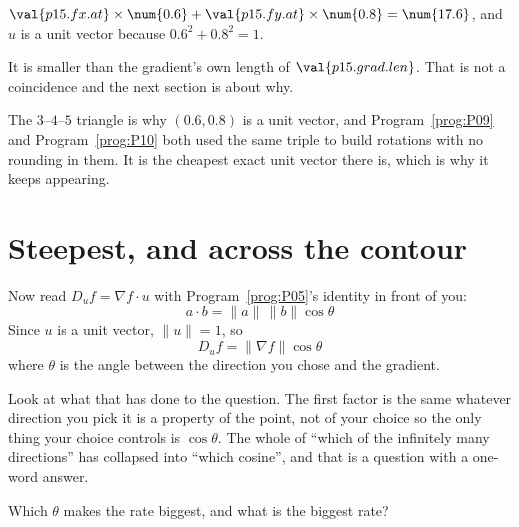 \begin{fr}
\begin{ansblock}
$\val{p15.fx.at} \times \num{0.6} + \val{p15.fy.at} \times \num{0.8} =
\num{17.6}$, and $u$ is a unit vector because
$\num{0.6}^{2} + \num{0.8}^{2} = 1$.
\end{ansblock}


It is smaller than the gradient's own length of $\val{p15.grad.len}$. That is
not a coincidence and the next section is about why.

\begin{note}
The $3$--$4$--$5$ triangle is why $(\num{0.6}, \num{0.8})$ is a unit vector,
and Program~\ref{prog:P09} and Program~\ref{prog:P10} both used the same
triple to build rotations with no rounding in them. It is the cheapest exact
unit vector there is, which is why it keeps appearing.
\end{note}
\end{fr}

\section{Steepest, and across the contour}
\label{sec:P15-steepest}

\begin{fr}
Now read $D_u f = \nabla f \cdot u$ with Program~\ref{prog:P05}'s identity
in front of you:
\[ a \cdot b = \lVert a \rVert \, \lVert b \rVert \cos\theta \]
Since $u$ is a unit vector, $\lVert u \rVert = 1$, so
\[ D_u f = \lVert \nabla f \rVert \cos\theta \]
where $\theta$ is the angle between the direction you chose and the gradient.

Look at what that has done to the question. The first factor is the same
whatever direction you pick \dash{} it is a property of the point, not of your
choice \dash{} so the only thing your choice controls is $\cos\theta$. The
whole of \enquote{which of the infinitely many directions} has collapsed into
\enquote{which cosine}, and that is a question with a one-word answer.

Which $\theta$ makes the rate biggest, and what is the biggest rate?
\dotline
\nextframe
\end{fr}

